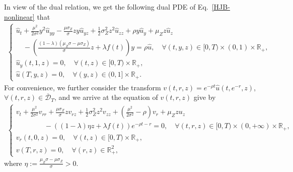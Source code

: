 \documentclass[11pt,times,letter]{article}
\newcommand{\R}{\mathds{R}}
\numberwithin{equation}{section}
\begin{document}
In view of the dual relation, we get the following dual PDE of Eq.~\eqref{HJB-nonlinear} that
\begin{align}\label{eq:dual-u}
\begin{cases}
\displaystyle \hat{u}_t+\frac{\mu^2}{2\sigma^2}y^2\hat{u}_{yy}-\frac{\mu\sigma_Z }{\sigma}zy\hat{u}_{yz}+\frac{1}{2}\sigma_Z^2z^2\hat{u}_{zz}+\rho y\hat{u}_y+\mu_Zz\hat{u}_z\\[0.9em]
\displaystyle \quad-\left(\frac{(1-\lambda)(\mu_Z\sigma-\mu\sigma_Z)}{\sigma}z+\lambda f(t)\right)y=\rho \hat{u},\quad \forall(t,y,z)\in[0,T)\times (0,1)\times\R_+,\\[0.8em]
\displaystyle \hat{u}_y(t,1,z)=0,\quad \forall(t,z)\in[0,T)\times \R_+,\\[0.6em]
\displaystyle \hat{u}(T,y,z)=0,\quad \forall(y,z)\in(0,1]\times\R_+.
\end{cases}
\end{align}
For convenience, we further consider the transform  
 $v(t,r,z)=e^{-\rho t}\hat{u}\left(t,e^{-r},z\right)$,  $\forall (t,r,z)\in\overline{\mathcal{D}}_T$, and we arrive at the equation of  $v(t,r,z)$ give by
\begin{align}\label{eq:HJB-v}
\begin{cases}
\displaystyle v_t+\frac{\mu^2}{2\sigma^2}v_{rr}+\frac{\mu\sigma_Z }{\sigma}zv_{rz}+\frac{1}{2}\sigma_Z^2z^2v_{zz}+\left(\frac{\mu^2}{2\sigma^2}-\rho\right) v_r+\mu_Z zu_z\\[0.8em]
\displaystyle\qquad\qquad-\left((1-\lambda)\eta z+\lambda f(t)\right)e^{-\rho t-r}=0,\quad \forall(t,r,z)\in[0,T)\times (0,+\infty)\times\R_+,\\[0.8em]
\displaystyle v_r(t,0,z)=0,\quad \forall(t,z)\in[0,T)\times\R_+,\\[0.6em]
\displaystyle v(T,r,z)=0,\quad \forall(r,z)\in\R_+^2,
\end{cases}
\end{align}
where $\eta:=\frac{\mu_Z\sigma-\mu\sigma_Z}{\sigma}>0$.
\end{document}
